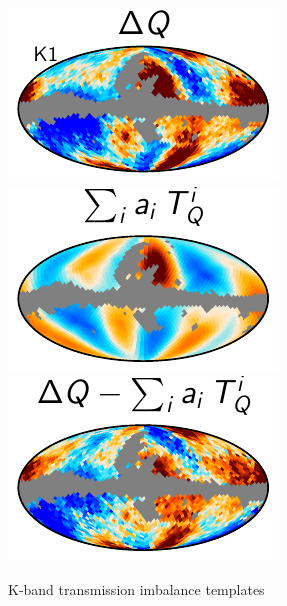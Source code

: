 \documentclass[twocolumn]{../../common/aa}
\begin{document}
\begin{figure}[t]
  \centering
  \includegraphics[width=\linewidth]{figures/diff_K1_Q.pdf}\\
  \includegraphics[width=\linewidth]{figures/temp_corr_K1_Q.pdf}\\
  \includegraphics[width=\linewidth]{figures/res_loss_K1_Q.pdf}
  \caption{K-band transmission imbalance templates}
  \label{fig:Kimbal}
\end{figure}
\end{document}
